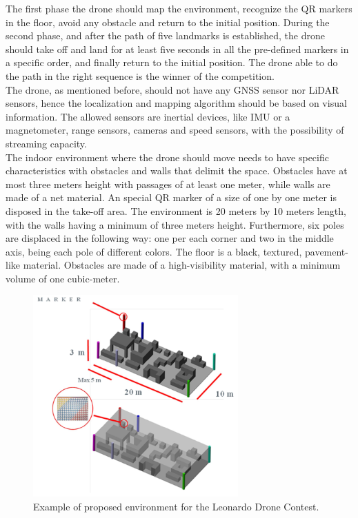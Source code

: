 The first phase the drone should map the environment, recognize the QR markers in the floor, avoid any obstacle and return to the initial position. During the second phase, and after the path of five landmarks is established, the drone should take off and land for at least five seconds in all the pre-defined markers in a specific order, and finally return to the initial position. The drone able to do the path in the right sequence is the winner of the competition. \\

The drone, as mentioned before, should not have any GNSS sensor nor LiDAR sensors, hence the localization and mapping algorithm should be based on visual information. The allowed sensors are inertial devices, like IMU or a magnetometer, range sensors, cameras and speed sensors, with the possibility of streaming capacity. \\

The indoor environment where the drone should move needs to have specific characteristics with obstacles and walls that delimit the space. Obstacles have at most three meters height with passages of at least one meter, while walls are made of a net material. An special QR marker of a size of one by one meter is disposed in the take-off area. The environment is 20 meters by 10 meters length, with the walls having a minimum of three meters height. Furthermore, six poles are displaced in the following way: one per each corner and two in the middle axis, being each pole of different colors. The floor is a black, textured, pavement-like material. Obstacles are made of a high-visibility material, with a minimum volume of one cubic-meter.\\
\begin{figure}
    \centering
    \includegraphics[width=0.7\textwidth]{Images/fig25-contest-env.png}
    \caption[Example of proposed environment]{Example of proposed environment for the Leonardo Drone Contest.}
    \label{fig:chapter0:contest-env}
\end{figure}

